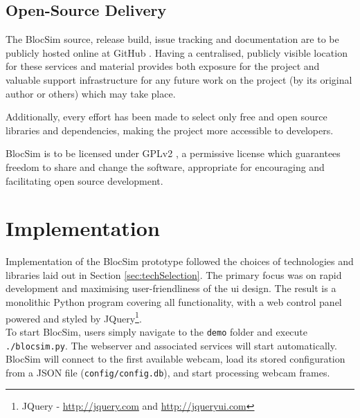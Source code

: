 \clearpage


\section{Open-Source Delivery}

The BlocSim source, release build, issue tracking and documentation are to be publicly hosted online at GitHub \cite{blocsim}\cite{github}. Having a centralised, publicly visible location for these services and material provides both exposure for the project and valuable support infrastructure for any future work on the project (by its original author or others) which may take place. 

Additionally, every effort has been made to select only free and open source libraries and dependencies, making the project more accessible to developers.

BlocSim is to be licensed under GPLv2 \cite{gplv2}, a permissive license which guarantees freedom to share and change the software, appropriate for encouraging and facilitating open source development.
\\



\chapter{Implementation}

Implementation of the BlocSim prototype followed the choices of technologies and libraries laid out in Section \ref{sec:techSelection}. The primary focus was on rapid development and maximising user-friendliness of the \gls{ui} design. The result is a monolithic Python program covering all functionality, with a web control panel powered and styled by JQuery\footnote{JQuery - \url{http://jquery.com} and \url{http://jqueryui.com}}.
\\

To start BlocSim, users simply navigate to the \texttt{demo} folder and execute \texttt{./blocsim.py}. The webserver and associated services will start automatically. BlocSim will connect to the first available webcam, load its stored configuration from a JSON file (\texttt{config/config.db}), and start processing webcam frames.
\\

\newpage

